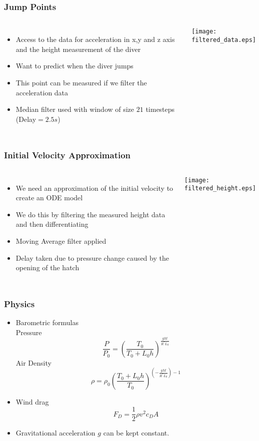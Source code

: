\documentclass{beamer}
\begin{document}
\begin{frame}
\frametitle{Jump Points}
\begin{columns}[c]
\column{2in}
\begin{itemize}
\item Access to the data for acceleration in x,y and z axis and the height measurement of the diver
\item Want to predict when the diver jumps
\item This point can be measured if we filter the acceleration data
\item Median filter used with window of size $21$ timesteps (Delay$=2.5s$)
\end{itemize}
\column{3in}
\texttt{[image: filtered\_data.eps]}
\end{columns}
\end{frame}

\begin{frame}
\frametitle{Initial Velocity Approximation}
\begin{columns}[c]
\column{2.5in}
\begin{itemize}
\item We need an approximation of the initial velocity to create an ODE model
\item We do this by filtering the measured height data and then differentiating
\item Moving Average filter applied
\item Delay taken due to pressure change caused by the opening of the hatch
\end{itemize}
\column{2.5in}
\texttt{[image: filtered\_height.eps]}
\end{columns}
\end{frame}

\begin{frame}
\frametitle{Physics}
\begin{itemize}
\item Barometric formulas\\ 
	Pressure
	\begin{equation*}
	\frac{P}{P_0} = \left(\frac{T_0}{T_0+L_0h}\right)^{\frac{gM}{R^*L_0}}
	\end{equation*}
	Air Density
	\begin{equation*}
	\rho = \rho _0 \left( \frac{T_0+L_0 h}{T_0}\right) ^{\left(-\frac{gM}{R^*L_0}\right)-1}
	\end{equation*}
	
\item Wind drag
	\begin{equation*}
	F_D=\frac{1}{2}\rho v^2c_DA
	\end{equation*}
\item Gravitational acceleration $g$ can be kept constant.
\end{itemize}
\end{frame}
\end{document}

